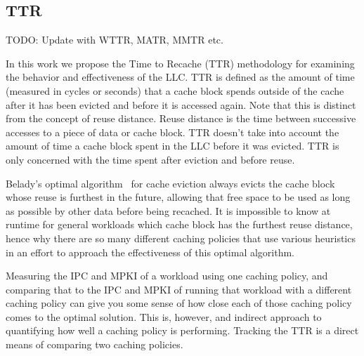 %

\subsection{TTR}

TODO: Update with WTTR, MATR, MMTR etc.

In this work we propose the Time to Recache (TTR) methodology for
examining the behavior and effectiveness of the LLC.  TTR is defined
as the amount of time (measured in cycles or seconds) that a cache
block spends outside of the cache after it has been evicted and
before it is accessed again.  Note that this is distinct from the
concept of reuse distance.  Reuse distance is the time between
successive accesses to a piece of data or cache block.  TTR doesn't
take into account the amount of time a cache block spent in the LLC
before it was evicted.  TTR is only concerned with the time spent
after eviction and before reuse.

Belady's optimal algorithm~\cite{belady66} for cache eviction always
evicts
the cache block whose reuse is furthest in the future, allowing that
free space to be used as long as possible by other data before being
recached.  It is impossible to know at runtime for general workloads
which cache block has the furthest reuse distance, hence why there are
so many different caching policies that use various heuristics in an
effort to approach the effectiveness of this optimal algorithm.

Measuring the IPC and MPKI of a workload using one caching policy, and
comparing that to the IPC and MPKI of running that workload with a
different caching policy can give you some sense of how close each of
those caching policy comes to the optimal solution.  This is,
however, and indirect approach to quantifying how well a caching
policy is performing.  Tracking the TTR is a direct means of
comparing two caching policies.

